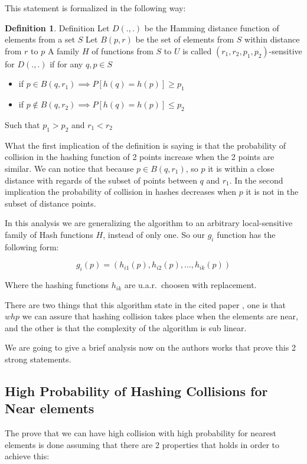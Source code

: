 \documentclass[12pt, a4paper]{article}
\theoremstyle{definition}
\begin{document}
This statement is formalized in the following way:

\newtheorem*{prob}{Definition}
\begin{prob}{Definition}
  Let $D(.,.)$ be the Hamming distance function of elements from a set $S$
  Let $B(p,r)$ be the set of elements from $S$ within distance from $r$ to $p$
  A family $H$ of functions from $S$ to $U$ is called $(r_1, r_2, p_1, p_2)$-sensitive for $D(.,.)$ if for any $q, p \in S$
  \begin{itemize}
    \item if $p \in B(q,r_1) \implies P[h(q) = h(p)] \geq p_1$
    \item if $p \notin B(q,r_2) \implies P[h(q) = h(p)] \leq p_2$
  \end{itemize}
  Such that $p_1 > p_2$ and $r_1 < r_2$
\end{prob}

What the first implication of the definition is saying is that the probability of collision in the hashing function of 2 points increase when the 2 points are similar. We can notice that because $p \in B(q,r_1)$, so $p$ it is within a close distance with regards of the subset of points between $q$ and $r_1$. In the second implication the probability of collision in hashes decreases when $p$ it is not in the subset of distance points.

In this analysis we are generalizing the algorithm to an arbitrary local-sensitive family of Hash functions $H$, instead of only one. So our $g_i$ function has the following form:

\begin{equation*}
  g_i(p) = (h_{i1}(p), h_{i2}(p), \dots, h_{ik}(p))
\end{equation*}

Where the hashing functions $h_{ik}$ are u.a.r.\ choosen with replacement.

There are two things that this algorithm state in the cited paper \cite{gionis_sim_search}, one is that $whp$ we can assure that hashing collision takes place when the elements are near, and the other is that the complexity of the algorithm is sub linear.

We are going to give a brief analysis now on the authors works that prove this 2 strong statements.

\subsection{High Probability of Hashing Collisions for Near elements}
The prove that we can have high collision with high probability for nearest elements is done assuming that there are 2 properties that holds in order to achieve this:
\end{document}
